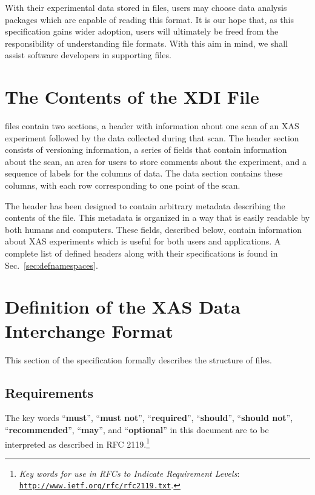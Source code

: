 \documentclass{article}
\begin{document}
With their experimental data stored in {\xdi} files, users may choose
data analysis packages which are capable of reading this format.  It
is our hope that, as this specification gains wider adoption, users
will ultimately be freed from the responsibility of understanding file
formats.  With this aim in mind, we shall assist software developers
in supporting {\xdi} files.


\section{The Contents of the XDI File}
\label{sec:contents_ixsif}

{\xdi} files contain two sections, a header with information about one
scan of an XAS experiment followed by the data collected during that
scan. The header section consists of versioning information, a series
of fields that contain information about the scan, an area for users
to store comments about the experiment, and a sequence of labels for
the columns of data. The data section contains these columns, with
each row corresponding to one point of the scan.

The header has been designed to contain arbitrary metadata describing
the contents of the file. This metadata is organized in a way that is
easily readable by both humans and computers. These fields, described
below, contain information about XAS experiments which is useful for
both users and applications. A complete list of defined headers along
with their specifications is found in Sec.~\ref{sec:defnamespaces}.


\section{Definition of the XAS Data Interchange Format}
\label{sec:def_ixsif}

This section of the {\xdi} specification formally describes the
structure of {\xdi} files.

\subsection{Requirements}
\label{sec:def_requirements}

The key words ``\textbf{must}'', ``\textbf{must not}'',
``\textbf{required}'', ``\textbf{should}'', ``\textbf{should not}'',
``\textbf{recommended}'', ``\textbf{may}'', and ``\textbf{optional}''
in this document are to be interpreted as described in RFC
2119.\footnote{\textit{Key words for use in RFCs to Indicate
    Requirement Levels}: \href{http://www.ietf.org/rfc/rfc2119.txt}
  {\texttt{http://www.ietf.org/rfc/rfc2119.txt}}.}
\end{document}
